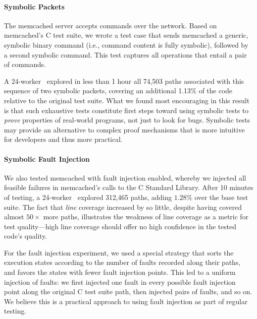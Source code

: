 \paragraph{Symbolic Packets}

The memcached server accepts commands over the network. Based on memcached's C test suite, we wrote a test case that sends memcached a generic, symbolic binary command (i.e., command content is fully symbolic), followed by a second symbolic command. This test captures all operations that entail a pair of commands.

A 24-worker \cnine\ explored in less than 1 hour all 74,503 paths associated with this sequence of two symbolic packets, covering an additional 1.13\% of the  code relative to the original test suite.  What we found most encouraging in this result is that such exhaustive tests constitute first steps toward using symbolic tests to \emph{prove} properties of real-world programs, not just to look for bugs.  Symbolic tests may provide an alternative to complex proof mechanisms that is more intuitive for developers and thus more practical.

\paragraph{Symbolic Fault Injection}

We also tested memcached with fault injection enabled, whereby we injected all feasible failures in memcached's calls to the C Standard Library.  After 10 minutes of testing, a 24-worker \cnine\ explored 312,465 paths, adding $1.28\%$ over the base test suite.  The fact that {\em line} coverage increased by so little, despite having covered almost $50\times$ more paths, illustrates the weakness of line coverage as a metric for test quality---high line coverage should offer no high confidence in the tested code's quality.

For the fault injection experiment, we used a special strategy that sorts the execution states according to the number of faults recorded along their paths, and favors the states with fewer fault injection points. This led to a uniform injection of faults: we first injected one fault in every possible fault injection point along the original C test suite path, then injected pairs of faults, and so on.  We believe this is a practical approach to using fault injection as part of regular testing.


